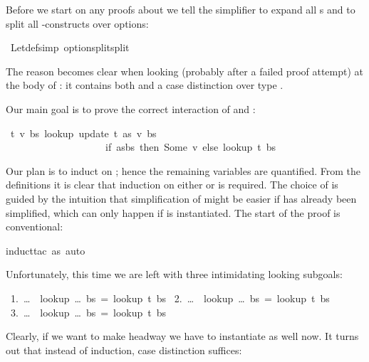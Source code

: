 \begin{isabellebody}
\begin{isamarkuptext}
Before we start on any proofs about  we tell the simplifier to
expand all s and to split all -constructs over
options:%
\end{isamarkuptext}%
\isamarkuptrue%
\ Let{\isacharunderscore}def{\isacharbrackleft}simp{\isacharbrackright}\ option{\isachardot}split{\isacharbrackleft}split{\isacharbrackright}\isamarkupfalse%
%
\begin{isamarkuptext}%
\noindent
The reason becomes clear when looking (probably after a failed proof
attempt) at the body of : it contains both
 and a case distinction over type .

Our main goal is to prove the correct interaction of  and
:%
\end{isamarkuptext}%
\isamarkuptrue%
\ {\isachardoublequote}{\isasymforall}t\ v\ bs{\isachardot}\ lookup\ {\isacharparenleft}update\ t\ as\ v{\isacharparenright}\ bs\ {\isacharequal}\isanewline
\ \ \ \ \ \ \ \ \ \ \ \ \ \ \ \ \ \ \ \ {\isacharparenleft}if\ as{\isacharequal}bs\ then\ Some\ v\ else\ lookup\ t\ bs{\isacharparenright}{\isachardoublequote}\isamarkupfalse%
%
\begin{isamarkuptxt}%
\noindent
Our plan is to induct on ; hence the remaining variables are
quantified. From the definitions it is clear that induction on either
 or  is required. The choice of  is 
guided by the intuition that simplification of  might be easier
if  has already been simplified, which can only happen if
 is instantiated.
The start of the proof is conventional:%
\end{isamarkuptxt}%
\isamarkuptrue%
induct{\isacharunderscore}tac\ as{\isacharcomma}\ auto{\isacharparenright}\isamarkupfalse%
%
\begin{isamarkuptxt}%
\noindent
Unfortunately, this time we are left with three intimidating looking subgoals:
\begin{isabelle}
~1.~\dots~{\isasymLongrightarrow}~lookup~\dots~bs~=~lookup~t~bs\isanewline
~2.~\dots~{\isasymLongrightarrow}~lookup~\dots~bs~=~lookup~t~bs\isanewline
~3.~\dots~{\isasymLongrightarrow}~lookup~\dots~bs~=~lookup~t~bs
\end{isabelle}
Clearly, if we want to make headway we have to instantiate  as
well now. It turns out that instead of induction, case distinction
suffices:%
\end{isamarkuptxt}%
\isamarkuptrue%

\end{isabellebody}
